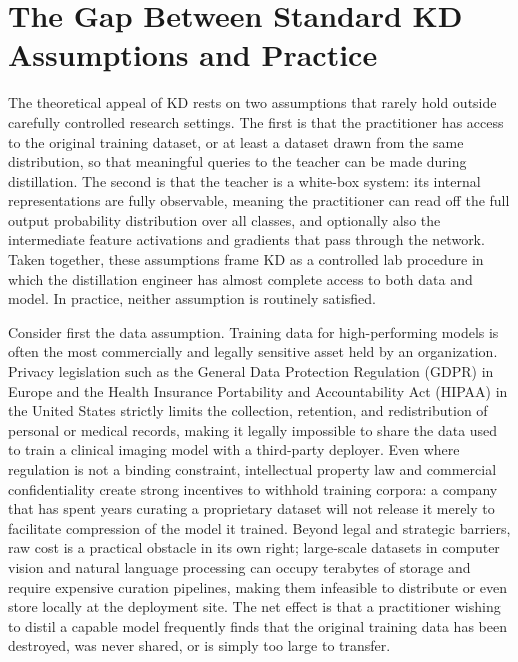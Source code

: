 \section{The Gap Between Standard KD Assumptions and Practice} \label{sec:12-introduction-gap}

\begin{foldable}
  The theoretical appeal of \ac{KD} rests on two assumptions that rarely hold outside carefully controlled research settings.
  The first is that the practitioner has access to the original training dataset, or at least a dataset drawn from the same distribution, so that meaningful queries to the teacher can be made during distillation.
  The second is that the teacher is a white-box system: its internal representations are fully observable, meaning the practitioner can read off the full output probability distribution over all classes, and optionally also the intermediate feature activations and gradients that pass through the network.
  Taken together, these assumptions frame \ac{KD} as a controlled lab procedure in which the distillation engineer has almost complete access to both data and model.
  In practice, neither assumption is routinely satisfied.
\end{foldable}

\begin{foldable}
  Consider first the data assumption.
  Training data for high-performing models is often the most commercially and legally sensitive asset held by an organization.
  Privacy legislation such as the General Data Protection Regulation (GDPR) in Europe and the Health Insurance Portability and Accountability Act (HIPAA) in the United States strictly limits the collection, retention, and redistribution of personal or medical records, making it legally impossible to share the data used to train a clinical imaging model with a third-party deployer.
  Even where regulation is not a binding constraint, intellectual property law and commercial confidentiality create strong incentives to withhold training corpora: a company that has spent years curating a proprietary dataset will not release it merely to facilitate compression of the model it trained.
  Beyond legal and strategic barriers, raw cost is a practical obstacle in its own right; large-scale datasets in computer vision and natural language processing can occupy terabytes of storage and require expensive curation pipelines, making them infeasible to distribute or even store locally at the deployment site.
  The net effect is that a practitioner wishing to distil a capable model frequently finds that the original training data has been destroyed, was never shared, or is simply too large to transfer.
\end{foldable}

